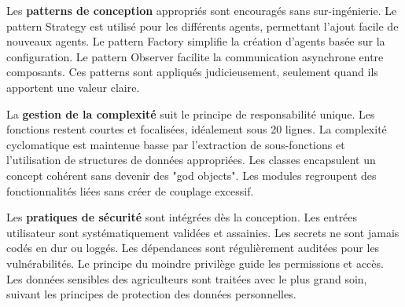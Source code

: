 Les \textbf{patterns de conception} appropriés sont encouragés sans sur-ingénierie. Le pattern Strategy est utilisé pour les différents agents, permettant l'ajout facile de nouveaux agents. Le pattern Factory simplifie la création d'agents basée sur la configuration. Le pattern Observer facilite la communication asynchrone entre composants. Ces patterns sont appliqués judicieusement, seulement quand ils apportent une valeur claire.

La \textbf{gestion de la complexité} suit le principe de responsabilité unique. Les fonctions restent courtes et focalisées, idéalement sous 20 lignes. La complexité cyclomatique est maintenue basse par l'extraction de sous-fonctions et l'utilisation de structures de données appropriées. Les classes encapsulent un concept cohérent sans devenir des "god objects". Les modules regroupent des fonctionnalités liées sans créer de couplage excessif.

Les \textbf{pratiques de sécurité} sont intégrées dès la conception. Les entrées utilisateur sont systématiquement validées et assainies. Les secrets ne sont jamais codés en dur ou loggés. Les dépendances sont régulièrement auditées pour les vulnérabilités. Le principe du moindre privilège guide les permissions et accès. Les données sensibles des agriculteurs sont traitées avec le plus grand soin, suivant les principes de protection des données personnelles.

